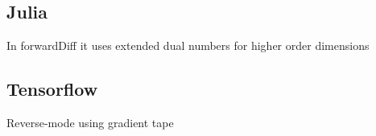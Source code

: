 \subsection{Julia}
In forwardDiff it uses extended dual numbers for higher order dimensions 



\subsection{Tensorflow}

Reverse-mode using gradient tape





  \newpage
  \nocite{*}
  \printbibliography


